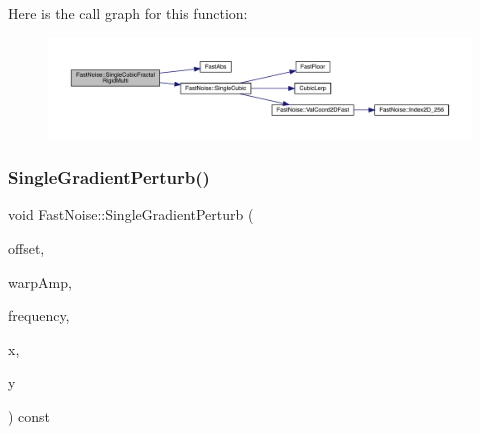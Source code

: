 Here is the call graph for this function\+:
\nopagebreak
\begin{figure}[H]
\begin{center}
\leavevmode
\includegraphics[width=350pt]{class_fast_noise_ab460847f52a3b64ac6ebbda5538c9c9a_cgraph}
\end{center}
\end{figure}
\mbox{\label{class_fast_noise_a10f8238bf167c02937ad19c0f081549a}} 
\subsubsection{\texorpdfstring{Single\+Gradient\+Perturb()}{SingleGradientPerturb()}\hspace{0.1cm}{\footnotesize\ttfamily [1/2]}}
{\footnotesize\ttfamily void Fast\+Noise\+::\+Single\+Gradient\+Perturb (\begin{DoxyParamCaption}\item[{unsigned char}]{offset,  }\item[{\mbox{\hyperlink{_fast_noise_8h_a75a9ef6d2541c4921815b885bfd449c3}{F\+N\+\_\+\+D\+E\+C\+I\+M\+AL}}}]{warp\+Amp,  }\item[{\mbox{\hyperlink{_fast_noise_8h_a75a9ef6d2541c4921815b885bfd449c3}{F\+N\+\_\+\+D\+E\+C\+I\+M\+AL}}}]{frequency,  }\item[{\mbox{\hyperlink{_fast_noise_8h_a75a9ef6d2541c4921815b885bfd449c3}{F\+N\+\_\+\+D\+E\+C\+I\+M\+AL}} \&}]{x,  }\item[{\mbox{\hyperlink{_fast_noise_8h_a75a9ef6d2541c4921815b885bfd449c3}{F\+N\+\_\+\+D\+E\+C\+I\+M\+AL}} \&}]{y }\end{DoxyParamCaption}) const\hspace{0.3cm}{\ttfamily [private]}}

